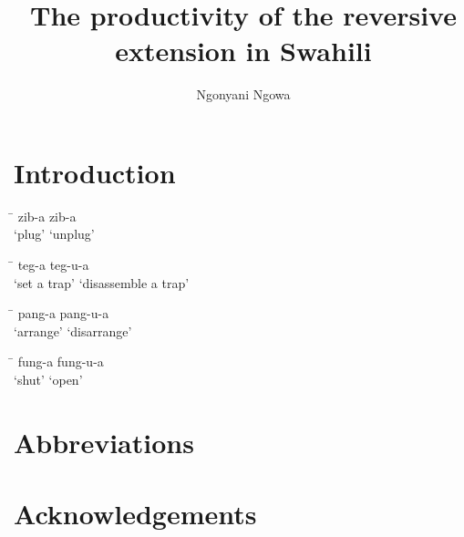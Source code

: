 \documentclass[output=paper]{langsci/langscibook}
\title{The productivity of the reversive extension in Swahili}
\author{%
 Ngonyani\affiliation{}\lastand 
 Ngowa \affiliation{}
}
\begin{document}
\section{Introduction} 
\newcommand{\tabme}[4]{%
  \begin{tabbing}
    \hspace{4cm} \= \hspace{4cm} \kill
    #1	\>		#2 \\
    #3	\>		#4 \\
  \end{tabbing}
}

\ea
\ea
\tabme{zib-a}{zib-a}{‘plug’}{‘unplug’}
\ex
\tabme{teg-a}{teg-u-a }{‘set a trap’}{‘disassemble a trap’}
\ex
\tabme{pang-a}{pang-u-a }{‘arrange’}{‘disarrange’}
\ex
\tabme{fung-a}{fung-u-a}{‘shut’ }{‘open’}
\z
\z
 



\section*{Abbreviations}
\section*{Acknowledgements}

\printbibliography[heading=subbibliography,notkeyword=this]
\end{document}
